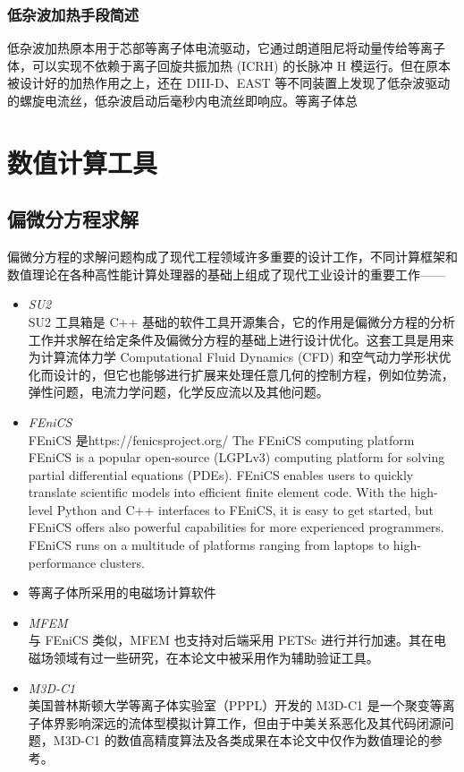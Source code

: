 \subsubsection{低杂波加热手段简述}
低杂波加热原本用于芯部等离子体电流驱动，它通过朗道阻尼将动量传给等离子体，可以实现不依赖于离子回旋共振加热 (ICRH) 的长脉冲 H 模运行。但在原本被设计好的加热作用之上，还在 DIII-D、EAST 等不同装置上发现了低杂波驱动的螺旋电流丝，低杂波启动后毫秒内电流丝即响应。等离子体总



\section{数值计算工具}
\subsection{偏微分方程求解}
偏微分方程的求解问题构成了现代工程领域许多重要的设计工作，不同计算框架和数值理论在各种高性能计算处理器的基础上组成了现代工业设计的重要工作——

\begin{itemize}
    \item \textit{SU2}\\SU2 工具箱是 C++ 基础的软件工具开源集合，它的作用是偏微分方程的分析工作并求解在给定条件及偏微分方程的基础上进行设计优化。这套工具是用来为计算流体力学 Computational Fluid Dynamics (CFD) 和空气动力学形状优化而设计的，但它也能够进行扩展来处理任意几何的控制方程，例如位势流，弹性问题，电流力学问题，化学反应流以及其他问题。
    \item \textit{FEniCS}\\FEniCS 是https://fenicsproject.org/ 
    The FEniCS computing platform
    FEniCS is a popular open-source (LGPLv3) computing platform for solving partial differential equations (PDEs). FEniCS enables users to quickly translate scientific models into efficient finite element code. With the high-level Python and C++ interfaces to FEniCS, it is easy to get started, but FEniCS offers also powerful capabilities for more experienced programmers. FEniCS runs on a multitude of platforms ranging from laptops to high-performance clusters.
    \item 等离子体所采用的电磁场计算软件
    \item \textit{MFEM}\\ 与 FEniCS 类似，MFEM 也支持对后端采用 PETSc 进行并行加速。其在电磁场领域有过一些研究，在本论文中被采用作为辅助验证工具。
    \item \textit{M3D-C1}\\ 美国普林斯顿大学等离子体实验室（PPPL）开发的 M3D-C1 是一个聚变等离子体界影响深远的流体型模拟计算工作，但由于中美关系恶化及其代码闭源问题，M3D-C1 的数值高精度算法及各类成果在本论文中仅作为数值理论的参考。
\end{itemize}


